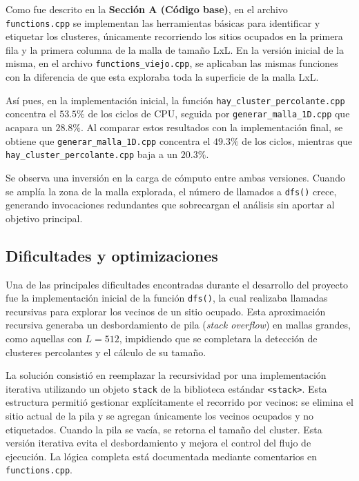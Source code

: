 \documentclass[%
 reprint,
 amsmath,amssymb,
 aps,
]{revtex4-2}
\begin{document}
Como fue descrito en la \textbf{ Sección A (Código base)}, en el archivo \texttt{functions.cpp} se implementan las herramientas básicas para identificar y etiquetar los clusteres, únicamente recorriendo los sitios ocupados en la primera fila y la primera columna de la malla de tamaño LxL. En la versión inicial de la misma, en el archivo \texttt{functions\_viejo.cpp}, se aplicaban las mismas funciones con la diferencia de que esta exploraba toda la superficie de la malla LxL. 

Así pues, en la implementación inicial, la función \texttt{hay\_cluster\_percolante.cpp} concentra el $53.5\%$ de los ciclos de CPU, seguida por \texttt{generar\_malla\_1D.cpp} que acapara un $28.8\%$. Al comparar estos resultados con la implementación final, se obtiene que \texttt{generar\_malla\_1D.cpp} concentra el $49.3\%$ de los ciclos, mientras que \texttt{hay\_cluster\_percolante.cpp} baja a un $20.3\%$. 

Se observa una inversión en la carga de cómputo entre ambas versiones. Cuando se amplía la zona de la malla explorada, el número de llamados a \texttt{dfs()} crece, generando invocaciones redundantes que sobrecargan el análisis sin aportar al objetivo principal.

\subsection{Dificultades y optimizaciones}

Una de las principales dificultades encontradas durante el desarrollo del proyecto fue la implementación inicial de la función \texttt{dfs()}, la cual realizaba llamadas recursivas para explorar los vecinos de un sitio ocupado. Esta aproximación recursiva generaba un desbordamiento de pila (\textit{stack overflow}) en mallas grandes, como aquellas con \( L = 512 \), impidiendo que se completara la detección de clusteres percolantes y el cálculo de su tamaño.

La solución consistió en reemplazar la recursividad por una implementación iterativa utilizando un objeto \texttt{stack} de la biblioteca estándar \texttt{<stack>}. Esta estructura permitió gestionar explícitamente el recorrido por vecinos: se elimina el sitio actual de la pila y se agregan únicamente los vecinos ocupados y no etiquetados. Cuando la pila se vacía, se retorna el tamaño del cluster. Esta versión iterativa evita el desbordamiento y mejora el control del flujo de ejecución. La lógica completa está documentada mediante comentarios en \texttt{functions.cpp}.
\end{document}
